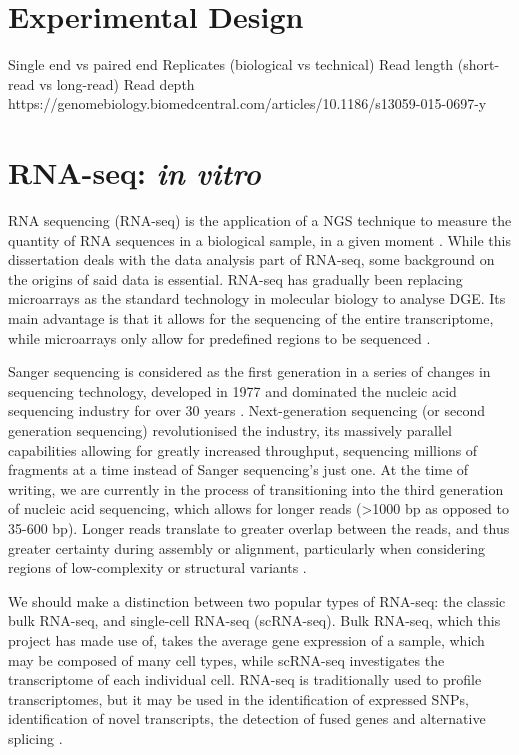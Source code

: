\section{Experimental Design}
Single end vs paired end
Replicates (biological vs technical)
Read length (short-read vs long-read)
Read depth
https://genomebiology.biomedcentral.com/articles/10.1186/s13059-015-0697-y
\section{RNA-seq: \textit{in vitro}}
RNA sequencing (RNA-seq) is the application of a \ac{NGS} technique to measure the quantity of RNA sequences in a biological sample, in a given moment \citep{zhong2009}. While this dissertation deals with the data analysis part of RNA-seq, some background on the origins of said data is essential. RNA-seq has gradually been replacing microarrays as the standard technology in molecular biology to analyse \ac{DGE}. Its main advantage is that it allows for the sequencing of the entire transcriptome, while microarrays only allow for predefined regions to be sequenced \citep{rao2019comparison}. 

Sanger sequencing is considered as the first generation in a series of changes in sequencing technology, developed in 1977 and dominated the nucleic acid sequencing industry for over 30 years \citep{behjati2013next}. Next-generation sequencing (or second generation sequencing) revolutionised the industry, its massively parallel capabilities allowing for greatly increased throughput, sequencing millions of fragments at a time instead of Sanger sequencing's just one. At the time of writing, we are currently in the process of transitioning into the third generation of nucleic acid sequencing, which allows for longer reads (>1000 bp as opposed to 35-600 bp). Longer reads translate to greater overlap between the reads, and thus greater certainty during assembly or alignment, particularly when considering regions of low-complexity or structural variants \citep{rhoads2015pacbio}. 

We should make a distinction between two popular types of RNA-seq: the classic bulk RNA-seq, and single-cell RNA-seq (scRNA-seq). Bulk RNA-seq, which this project has made use of, takes the average gene expression of a sample, which may be composed of many cell types, while scRNA-seq investigates the transcriptome of each individual cell. RNA-seq is traditionally used to profile transcriptomes, but it may be used in the identification of expressed SNPs, identification of novel transcripts, the detection of fused genes and alternative splicing \citep{han2015alternative, zhao2014comparison}. 


